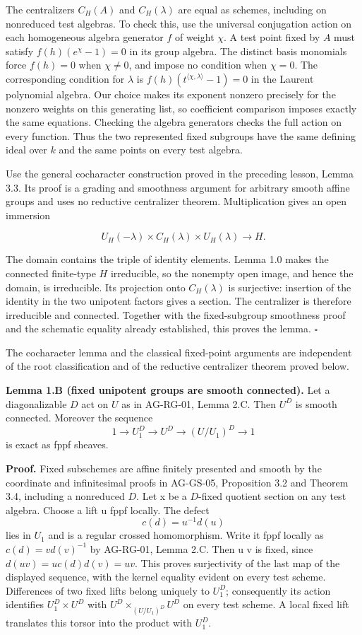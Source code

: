 \documentclass[11pt,a4paper,openany]{report}
\newcounter{none}
\begin{document}
The centralizers \(C_H(A)\) and \(C_H(\lambda)\) are equal as schemes, including on nonreduced test algebras. To check this, use the universal conjugation action on each homogeneous algebra generator \(f\) of weight \(\chi\). A test point fixed by \(A\) must satisfy \(f(h)(e^\chi-1)=0\) in its group algebra. The distinct basis monomials force \(f(h)=0\) when \(\chi\ne0\), and impose no condition when \(\chi=0\). The corresponding condition for \(\lambda\) is \(f(h)(t^{\langle\chi,\lambda\rangle}-1)=0\) in the Laurent polynomial algebra. Our choice makes its exponent nonzero precisely for the nonzero weights on this generating list, so coefficient comparison imposes exactly the same equations. Checking the algebra generators checks the full action on every function. Thus the two represented fixed subgroups have the same defining ideal over \(k\) and the same points on every test algebra.

Use the general cocharacter construction proved in the preceding lesson, Lemma 3.3. Its proof is a grading and smoothness argument for arbitrary smooth affine groups and uses no reductive centralizer theorem. Multiplication gives an open immersion

\[
U_H(-\lambda)\times C_H(\lambda)\times U_H(\lambda)\longrightarrow H.
\]

The domain contains the triple of identity elements. Lemma 1.0 makes the connected finite-type \(H\) irreducible, so the nonempty open image, and hence the domain, is irreducible. Its projection onto \(C_H(\lambda)\) is surjective: insertion of the identity in the two unipotent factors gives a section. The centralizer is therefore irreducible and connected. Together with the fixed-subgroup smoothness proof and the schematic equality already established, this proves the lemma. \(\square\)

The cocharacter lemma and the classical fixed-point arguments are independent of the root classification and of the reductive centralizer theorem proved below.

\textbf{Lemma 1.B (fixed unipotent groups are smooth connected).} Let a diagonalizable \(D\) act on \(U\) as in AG-RG-01, Lemma 2.C. Then \(U^D\) is smooth connected. Moreover the sequence \[
1\longrightarrow U_1^D\longrightarrow U^D
\longrightarrow (U/U_1)^D\longrightarrow1
\] is exact as fppf sheaves.

\textbf{Proof.} Fixed subschemes are affine finitely presented and smooth by the coordinate and infinitesimal proofs in AG-GS-05, Proposition 3.2 and Theorem 3.4, including a nonreduced \(D\). Let x be a \(D\)-fixed quotient section on any test algebra. Choose a lift u fppf locally. The defect \[
c(d)=u^{-1}d(u)
\] lies in \(U_1\) and is a regular crossed homomorphism. Write it fppf locally as \(c(d)=v d(v)^{-1}\) by AG-RG-01, Lemma 2.C. Then u v is fixed, since \(d(u v)=u c(d)d(v)=u v\). This proves surjectivity of the last map of the displayed sequence, with the kernel equality evident on every test scheme. Differences of two fixed lifts belong uniquely to \(U_1^D\); consequently its action identifies \(U_1^D\times U^D\) with \(U^D\times_{(U/U_1)^D}U^D\) on every test scheme. A local fixed lift translates this torsor into the product with \(U_1^D\).
\end{document}
